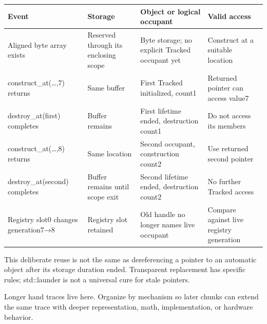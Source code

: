 {\def\LTcaptype{none} %
\begin{longtable}[]{@{}
  >{\raggedright\arraybackslash}p{}
  >{\raggedright\arraybackslash}p{}
  >{\raggedright\arraybackslash}p{}
  >{\raggedright\arraybackslash}p{}@{}}
\toprule\noalign{}
\begin{minipage}[b]{\linewidth}\raggedright
Event
\end{minipage} & \begin{minipage}[b]{\linewidth}\raggedright
Storage
\end{minipage} & \begin{minipage}[b]{\linewidth}\raggedright
Object or logical occupant
\end{minipage} & \begin{minipage}[b]{\linewidth}\raggedright
Valid access
\end{minipage} \\
\midrule\noalign{}
\endhead
\bottomrule\noalign{}
\endlastfoot
Aligned byte array exists & Reserved through its enclosing scope & Byte storage; no explicit Tracked occupant yet & Construct at a suitable location \\
construct\_at(\ldots,7) returns & Same buffer & First Tracked initialized, count1 & Returned pointer can access value7 \\
destroy\_at(first) completes & Buffer remains & First lifetime ended, destruction count1 & Do not access its members \\
construct\_at(\ldots,8) returns & Same location & Second occupant, construction count2 & Use returned second pointer \\
destroy\_at(second) completes & Buffer remains until scope exit & Second lifetime ended, destruction count2 & No further Tracked access \\
Registry slot0 changes generation7→8 & Registry slot retained & Old handle no longer names live occupant & Compare against live registry generation \\
\end{longtable}
}

This deliberate reuse is not the same as dereferencing a pointer to an automatic object after its storage duration ended. Transparent replacement has specific rules; std::launder is not a universal cure for stale pointers.

Longer hand traces live here. Organize by mechanism so later chunks can extend the same trace with deeper representation, math, implementation, or hardware behavior.

